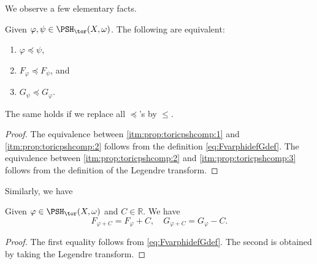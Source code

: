 We observe a few elementary facts.
\begin{proposition}\label{prop:toricpshcomp}
    Given $\varphi,\psi\in \PSH_{\tor}(X,\omega)$. The following are equivalent:
    \begin{enumerate}
        \item\label{itm:prop:toricpshcomp:1} $\varphi\preceq \psi$,
        \item\label{itm:prop:toricpshcomp:2} $F_{\varphi}\preceq F_{\psi}$, and
        \item\label{itm:prop:toricpshcomp:3} $G_{\psi}\preceq G_{\varphi}$.
    \end{enumerate}
    The same holds if we replace all $\preceq$'s by $\leq$.
\end{proposition}
\begin{proof}
    The equivalence between \ref{itm:prop:toricpshcomp:1} and \ref{itm:prop:toricpshcomp:2} follows from the definition \eqref{eq:FvarphidefGdef}. The equivalence between \ref{itm:prop:toricpshcomp:2} and \ref{itm:prop:toricpshcomp:3} follows from the definition of the Legendre transform.
\end{proof}

Similarly, we have
\begin{proposition}\label{prop:toricpluscst}
    Given $\varphi\in \PSH_{\tor}(X,\omega)$ and $C\in \mathbb{R}$. We have
    \[
    F_{\varphi+C}=F_{\varphi}+C,\quad G_{\varphi+C}=G_{\varphi}-C.
    \]
\end{proposition}
\begin{proof}
    The first equality follows from \eqref{eq:FvarphidefGdef}. The second is obtained by taking the Legendre transform.
\end{proof}

